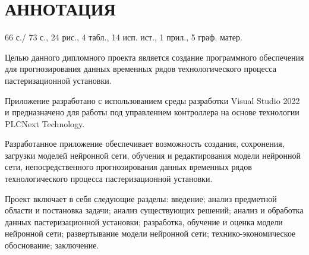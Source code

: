 \documentclass[a4paper, oneside]{report}
\newcommand{\sectionbreak}{\clearpage}
\newcommand\redline{\hspace{1.5cm}} %
\newcommand\titlespace{\vspace{26pt}} %
\newcommand\gostFont{\cyrillicfont \englishfont \fontsize{13pt}{15.6pt}\selectfont} %
\newcommand\gostTitleFont{\cyrillicfont \englishfont \fontsize{13pt}{0pt}\selectfont \bfseries} %
\begin{document}
 



	

	\sectionbreak \section*{
		\gostTitleFont
		\redline 
		АННОТАЦИЯ
	}
	
	\titlespace
	
	{\gostFont
	
	\par \redline 66 с./ 73 с.,  24 рис.,  4 табл., 14 исп. ист., 1 прил., 5 граф. матер.
	
	\par \redline 

	\par \redline Целью данного дипломного проекта является создание программного обеспечения для прогнозирования данных временных рядов технологического процесса пастеризационной установки. 
	
	\par \redline Приложение разработано с использованием среды разработки Visual Studio 2022 и предназначено для работы под управлением контроллера на основе технологии PLCNext Technology. 
	
	\par \redline Разработанное приложение обеспечивает возможность создания, сохронения, загрузки моделей нейронной сети, обучения и редактирования модели нейронной сети, непосредственного прогнозирования данных временных рядов технологического процесса пастеризационной установки.
	 
	\par \redline Проект включает в себя следующие разделы: введение; анализ предметной области и постановка задачи; анализ существующих решений; анализ и обработка данных пастеризационной установки; разработка, обучение и оценка модели нейронной сети; развертывание модели нейронной сети; технико-экономическое обоснование; заключение. 

	\par 
	
    }
	
\end{document}
